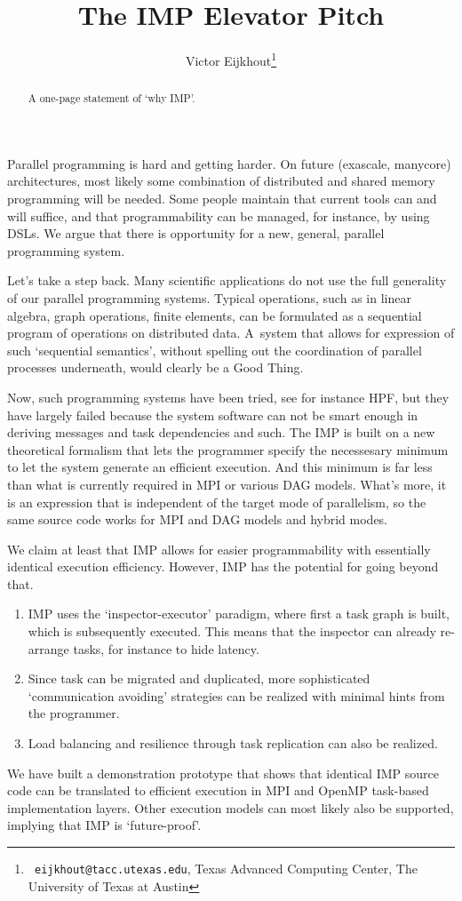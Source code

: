 \documentclass[11pt,fleqn,preprint]{impreport}
\title{The IMP Elevator Pitch}
\author[Eijkhout]{Victor Eijkhout\thanks{{\tt
      eijkhout@tacc.utexas.edu}, Texas Advanced Computing Center, The
    University of Texas at Austin}}
\begin{document}
\maketitle

\begin{abstract}
  A one-page statement of `why IMP'.
\end{abstract}

\section*{}

Parallel programming is hard and getting harder. On future (exascale,
manycore) architectures, most likely some combination of distributed
and shared memory programming will be needed. Some people maintain that
current tools can and will suffice, and that programmability can be
managed, for instance, by using \acp{DSL}. We argue that there is
opportunity for a new, general, parallel programming system.

Let's take a step back. Many scientific applications do not use
the full generality of our parallel programming systems. Typical
operations, such as in linear algebra, graph operations, finite
elements, can be formulated as a sequential program of operations on
distributed data. A~system that allows for expression of such
`sequential semantics', without spelling out the coordination of
parallel processes underneath, would clearly be a Good Thing.

Now, such programming systems have been tried, see for instance
\ac{HPF}, but they have largely failed because the system software can
not be smart enough in deriving messages and task dependencies and such.
%
The \acf{IMP} is built on a new theoretical formalism that lets the
programmer specify the necessesary minimum to let the system generate
an efficient execution. And this minimum is far less than what is
currently required in MPI or various \ac{DAG} models. What's more, it
is an expression that is independent of the target mode of
parallelism, so the same source code works for MPI and DAG models and
hybrid modes.

We claim at least that \ac{IMP} allows for easier
programmability with essentially identical execution efficiency.
However, \ac{IMP} has the potential for going beyond that.
\begin{enumerate}
\item IMP uses the `inspector-executor' paradigm, where first a task
  graph is built, which is subsequently executed. This means that the
  inspector can already re-arrange tasks, for instance to hide
  latency.
\item Since task can be migrated and duplicated, more sophisticated
  `communication avoiding' strategies can be realized with minimal
  hints from the programmer.
\item Load balancing and resilience through task replication can also
  be realized.
\end{enumerate}

We have built a demonstration prototype that shows that identical IMP
source code can be translated to efficient execution in MPI and OpenMP
task-based implementation layers. Other execution models can most
likely also be supported, implying that IMP is `future-proof'.
\end{document}
